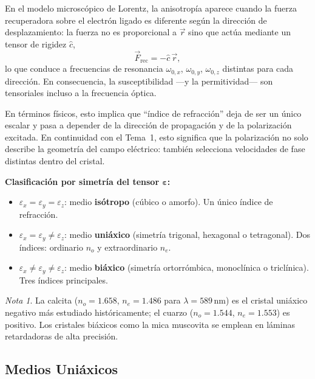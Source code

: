 \documentclass[12pt, a4paper]{article}
\theoremstyle{plain}
\theoremstyle{definition}
\theoremstyle{remark}
\newtheorem*{nota}{Nota}
\newcommand{\ve}[1]{\vec{#1}}
\begin{document}
En el modelo microscópico de Lorentz, la anisotropía aparece cuando la
fuerza recuperadora sobre el electrón ligado es diferente según la dirección
de desplazamiento: la fuerza no es proporcional a $\ve{r}$ sino que actúa
mediante un tensor de rigidez $\hat{c}$,
\begin{equation}
  \ve{F}_{\text{rec}} = -\hat{c}\,\ve{r},
\end{equation}
lo que conduce a frecuencias de resonancia $\omega_{0,x}$, $\omega_{0,y}$,
$\omega_{0,z}$ distintas para cada dirección. En consecuencia, la
susceptibilidad —y la permitividad— son tensoriales incluso a la frecuencia
óptica.

En términos físicos, esto implica que ``índice de refracción'' deja de ser un
único escalar y pasa a depender de la dirección de propagación y de la
polarización excitada.
En continuidad con el Tema~1, esto significa que la polarización no solo
describe la geometría del campo eléctrico: también selecciona velocidades de
fase distintas dentro del cristal.

\begin{mdframed}[style=resultado]
\textbf{Clasificación por simetría del tensor $\boldsymbol{\varepsilon}$:}
\begin{itemize}
  \item $\varepsilon_x=\varepsilon_y=\varepsilon_z$: medio \textbf{isótropo}
        (cúbico o amorfo). Un único índice de refracción.
  \item $\varepsilon_x=\varepsilon_y\neq\varepsilon_z$: medio \textbf{uniáxico}
        (simetría trigonal, hexagonal o tetragonal). Dos índices: ordinario $n_o$
        y extraordinario $n_e$.
  \item $\varepsilon_x\neq\varepsilon_y\neq\varepsilon_z$: medio \textbf{biáxico}
        (simetría ortorrómbica, monoclínica o triclínica). Tres índices principales.
\end{itemize}
\end{mdframed}

\begin{nota}
La calcita ($n_o=1.658$, $n_e=1.486$ para $\lambda=589\,\text{nm}$) es el
cristal uniáxico negativo más estudiado históricamente; el cuarzo
($n_o=1.544$, $n_e=1.553$) es positivo. Los cristales biáxicos como la mica
muscovita se emplean en láminas retardadoras de alta precisión.
\end{nota}

\subsection{Medios Uniáxicos}
\end{document}

